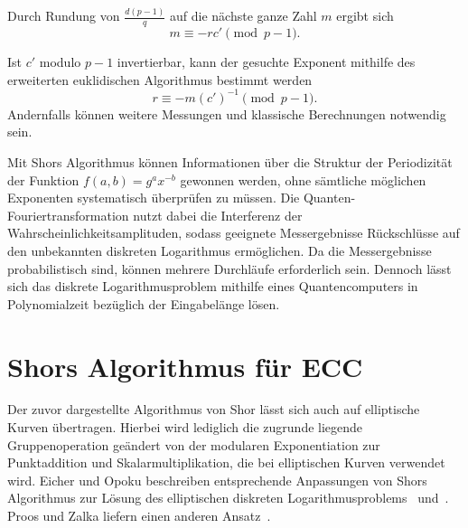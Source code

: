 \begin{enumerate}
    Durch Rundung von
    $\frac{d(p-1)}{q}$ auf die nächste
    ganze Zahl $m$ ergibt sich
    \[
    m\equiv-rc'\pmod{p-1}.
    \]

    Ist $c'$ modulo $p-1$ invertierbar,
    kann der gesuchte Exponent mithilfe
    des erweiterten euklidischen Algorithmus
    bestimmt werden
    \[
    r\equiv-m{(c')}^{-1}\pmod{p-1}.
    \]
    Andernfalls können weitere Messungen und klassische Berechnungen notwendig sein.
\end{enumerate}

Mit Shors Algorithmus können Informationen über die Struktur der Periodizität der Funktion \(f(a,b)=g^a x^{-b}\) gewonnen werden, ohne sämtliche möglichen Exponenten systematisch überprüfen zu müssen. Die Quanten-Fouriertransformation nutzt dabei die Interferenz der Wahrscheinlichkeitsamplituden, sodass geeignete Messergebnisse Rückschlüsse auf den unbekannten diskreten Logarithmus ermöglichen. Da die Messergebnisse probabilistisch sind, können mehrere Durchläufe erforderlich sein. Dennoch lässt sich das diskrete Logarithmusproblem mithilfe eines Quantencomputers in Polynomialzeit bezüglich der Eingabelänge lösen.


\section{Shors Algorithmus für ECC}
Der zuvor dargestellte Algorithmus von Shor lässt sich auch auf elliptische Kurven übertragen. Hierbei wird lediglich die zugrunde liegende Gruppenoperation geändert von der modularen Exponentiation zur Punktaddition und Skalarmultiplikation, die bei elliptischen Kurven verwendet wird. Eicher und Opoku beschreiben entsprechende Anpassungen von Shors Algorithmus zur Lösung des elliptischen diskreten
Logarithmusproblems~\cite[S.~216--219]{yan15} und~\cite[S.~21--27]{eicher97}. Proos und Zalka liefern einen anderen Ansatz~\cite[5--12]{proos2004}.

